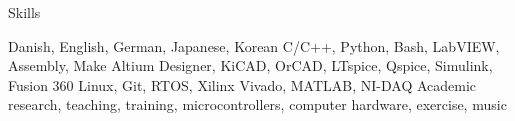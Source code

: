 \begin{rubric}{\faStar[solid] Skills}

\entry*[Languages][\faLanguage]
	Danish, English, German, Japanese, Korean
\entry*[Coding][\faCode]
	C/C++, Python, Bash, LabVIEW, Assembly, Make
	Altium Designer, KiCAD, OrCAD, LTspice, Qspice, Simulink, Fusion 360
\entry*[Technologies][\faTerminal]
	Linux, Git, RTOS, Xilinx Vivado, MATLAB, NI-DAQ
\entry*[Misc.][\faUser]
	Academic research, teaching, training, microcontrollers, computer hardware, exercise, music
\end{rubric}
